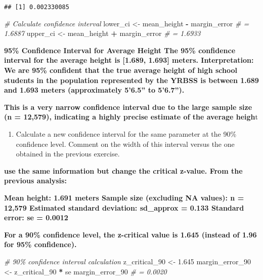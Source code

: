 \documentclass[
]{article}
\newenvironment{Shaded}{\begin{snugshade}}{\end{snugshade}}
\newcommand{\CommentTok}[1]{\textcolor[rgb]{0.56,0.35,0.01}{\textit{#1}}}
\newcommand{\FloatTok}[1]{\textcolor[rgb]{0.00,0.00,0.81}{#1}}
\newcommand{\NormalTok}[1]{#1}
\newcommand{\OtherTok}[1]{\textcolor[rgb]{0.56,0.35,0.01}{#1}}
\newcommand{\SpecialCharTok}[1]{\textcolor[rgb]{0.81,0.36,0.00}{\textbf{#1}}}
\providecommand{\tightlist}{%
  \setlength{\itemsep}{0pt}\setlength{\parskip}{0pt}}
\begin{document}
\begin{verbatim}
## [1] 0.002330085
\end{verbatim}

\begin{Shaded}
\begin{Highlighting}[]
\CommentTok{\# Calculate confidence interval}
\NormalTok{lower\_ci }\OtherTok{\textless{}{-}}\NormalTok{ mean\_height }\SpecialCharTok{{-}}\NormalTok{ margin\_error  }\CommentTok{\# = 1.6887}
\NormalTok{upper\_ci }\OtherTok{\textless{}{-}}\NormalTok{ mean\_height }\SpecialCharTok{+}\NormalTok{ margin\_error  }\CommentTok{\# = 1.6933}
\end{Highlighting}
\end{Shaded}

\textbf{95\% Confidence Interval for Average Height The 95\% confidence
interval for the average height is {[}1.689, 1.693{]} meters.
Interpretation: We are 95\% confident that the true average height of
high school students in the population represented by the YRBSS is
between 1.689 and 1.693 meters (approximately 5'6.5'' to 5'6.7'').}

\textbf{This is a very narrow confidence interval due to the large
sample size (n = 12,579), indicating a highly precise estimate of the
average heigh}t

\begin{enumerate}
\def\labelenumi{\arabic{enumi}.}
\setcounter{enumi}{8}
\tightlist
\item
  Calculate a new confidence interval for the same parameter at the 90\%
  confidence level. Comment on the width of this interval versus the one
  obtained in the previous exercise.
\end{enumerate}

\textbf{use the same information but change the critical z-value. From
the previous analysis:}

\textbf{Mean height: 1.691 meters Sample size (excluding NA values): n =
12,579 Estimated standard deviation: sd\_approx = 0.133 Standard error:
se = 0.0012}

\textbf{For a 90\% confidence level, the z-critical value is 1.645
(instead of 1.96 for 95\% confidence).}

\begin{Shaded}
\begin{Highlighting}[]
\CommentTok{\# 90\% confidence interval calculation}
\NormalTok{z\_critical\_90 }\OtherTok{\textless{}{-}} \FloatTok{1.645}
\NormalTok{margin\_error\_90 }\OtherTok{\textless{}{-}}\NormalTok{ z\_critical\_90 }\SpecialCharTok{*}\NormalTok{ se}
\NormalTok{margin\_error\_90  }\CommentTok{\# = 0.0020}
\end{Highlighting}
\end{Shaded}
\end{document}
